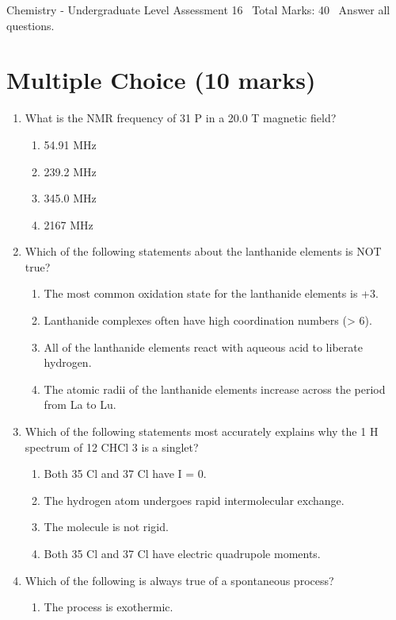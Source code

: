 \documentclass[12pt]{article}
\begin{document}
\begin{center}
Chemistry - Undergraduate Level Assessment 16 \
Total Marks: 40 \
Answer all questions.
\end{center}

\section*{Multiple Choice (10 marks)}
\begin{enumerate}[label=\arabic*.]
\item What is the NMR frequency of 31 P in a 20.0 T magnetic field?
\begin{enumerate}[label=(\alph*)]
    \item 54.91 MHz
    \item 239.2 MHz
    \item 345.0 MHz
    \item 2167 MHz
\end{enumerate}
\item Which of the following statements about the lanthanide elements is NOT true?
\begin{enumerate}[label=(\alph*)]
    \item The most common oxidation state for the lanthanide elements is +3.
    \item Lanthanide complexes often have high coordination numbers (\textgreater{} 6).
    \item All of the lanthanide elements react with aqueous acid to liberate hydrogen.
    \item The atomic radii of the lanthanide elements increase across the period from La to Lu.
\end{enumerate}
\item Which of the following statements most accurately explains why the 1 H spectrum of 12 CHCl 3 is a singlet?
\begin{enumerate}[label=(\alph*)]
    \item Both 35 Cl and 37 Cl have I = 0.
    \item The hydrogen atom undergoes rapid intermolecular exchange.
    \item The molecule is not rigid.
    \item Both 35 Cl and 37 Cl have electric quadrupole moments.
\end{enumerate}
\item Which of the following is always true of a spontaneous process?
\begin{enumerate}[label=(\alph*)]
    \item The process is exothermic.

\end{enumerate}
\end{enumerate}
\end{document}
